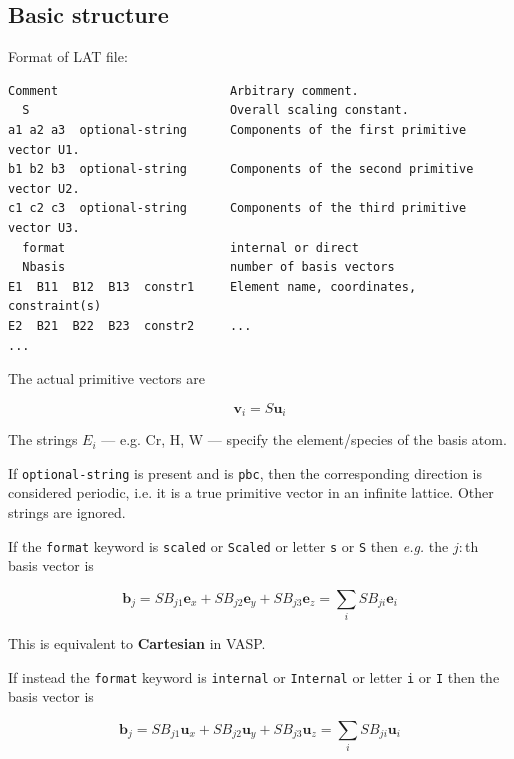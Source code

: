 \documentclass[a4paper,12pt,pdftex,onecolumn]{article}
\newcommand{\eg}{\emph{e.g.}\xspace}
\begin{document}
\subsection{Basic structure}

Format of LAT file:

\begin{Verbatim}[fontsize=\relsize{-1},frame=single]
Comment                        Arbitrary comment.
  S                            Overall scaling constant.
a1 a2 a3  optional-string      Components of the first primitive vector U1.
b1 b2 b3  optional-string      Components of the second primitive vector U2.
c1 c2 c3  optional-string      Components of the third primitive vector U3.
  format                       internal or direct
  Nbasis                       number of basis vectors
E1  B11  B12  B13  constr1     Element name, coordinates, constraint(s)
E2  B21  B22  B23  constr2     ...
...
\end{Verbatim}

The actual primitive vectors are

\begin{equation}
\mathbf{v}_i = S \mathbf{u}_i
\end{equation}

The strings $E_i$ --- e.g. Cr, H, W --- specify the element/species of the basis atom.

If \verb+optional-string+ is present and is \verb+pbc+, then
the corresponding direction is
considered periodic, i.e. it is a true primitive vector
in an infinite lattice. Other strings are ignored.

If the \verb+format+ keyword is \verb+scaled+ or \verb+Scaled+ or
letter \verb+s+ or \verb+S+ then \eg the $j:$th basis vector is

\begin{equation}
\mathbf{b}_j = S B_{j1} \mathbf{e}_x
+ S B_{j2} \mathbf{e}_y
+ S B_{j3} \mathbf{e}_z
= \sum_i S B_{ji} \mathbf{e}_i
\end{equation}

This is equivalent to \textbf{Cartesian} in VASP.

If instead the \verb+format+ keyword is \verb+internal+ or \verb+Internal+
or letter \verb+i+ or \verb+I+ then the basis vector is

\begin{equation}
\mathbf{b}_j = S B_{j1} \mathbf{u}_x
+ S B_{j2} \mathbf{u}_y
+ S B_{j3} \mathbf{u}_z
= \sum_i S B_{ji} \mathbf{u}_i
\end{equation}
\end{document}
